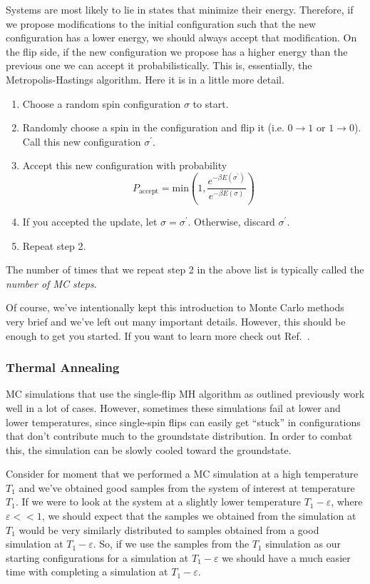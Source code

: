 \documentclass[12pt]{article}
\begin{document}
Systems are most likely to lie in states that minimize their energy. Therefore, if we propose modifications to the initial configuration such that the new configuration has a lower energy, we should always accept that modification. On the flip side, if the new configuration we propose has a higher energy than the previous one we can accept it probabilistically. This is, essentially, the Metropolis-Hastings algorithm. Here it is in a little more detail.
\begin{enumerate}
    \item Choose a random spin configuration $\sigma$ to start.
    \item Randomly choose a spin in the configuration and flip it (i.e. $0 \rightarrow 1$ or $1 \rightarrow 0$). Call this new configuration $\sigma^{\prime}$.
    \item Accept this new configuration with probability
        \begin{equation} \label{eq:acceptance}
            P_{\text{accept}} = \text{min}\left(1, \frac{e^{-\beta E(\sigma^\prime)}}{e^{-\beta E(\sigma)}}\right)
        \end{equation}
    \item If you accepted the update, let $\sigma = \sigma^\prime$. Otherwise, discard $\sigma^\prime$.
    \item Repeat step 2.
\end{enumerate}
The number of times that we repeat step 2 in the above list is typically called the {\it number of MC steps}.

Of course, we've intentionally kept this introduction to Monte Carlo methods very brief and we've left out many important details. However, this should be enough to get you started. If you want to learn more check out Ref.~\cite{NewmanMC}.

\subsubsection{Thermal Annealing}

MC simulations that use the single-flip MH algorithm as outlined previously work well in a lot of cases. However, sometimes these simulations fail at lower and lower temperatures, since single-spin flips can easily get ``stuck'' in configurations that don't contribute much to the groundstate distribution.  In order to combat this, the simulation can be slowly cooled toward the groundstate.

Consider for moment that we performed a MC simulation at a high temperature $T_1$ and we've obtained good samples from the system of interest at temperature $T_1$. If we were to look at the system at a slightly lower temperature $T_1 - \varepsilon$, where $\varepsilon << 1$, we should expect that the samples we obtained from the simulation at $T_1$ would be very similarly distributed to samples obtained from a good simulation at $T_1 - \varepsilon$. So, if we use the samples from the $T_1$ simulation as our starting configurations for a simulation at $T_1 - \varepsilon$ we should have a much easier time with completing a simulation at $T_1 - \varepsilon$.
\end{document}
